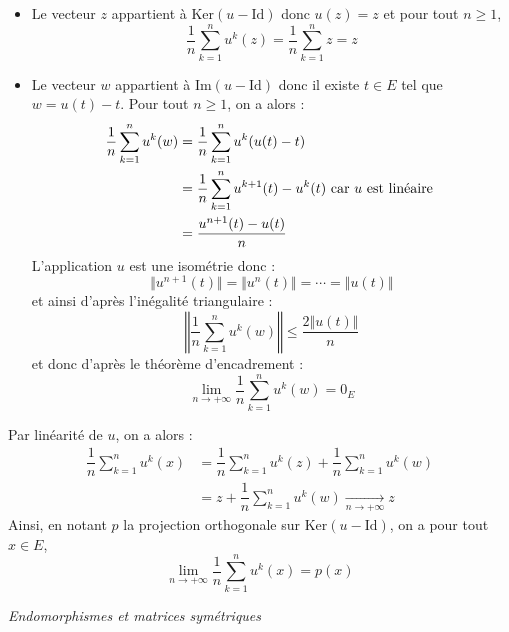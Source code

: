 \documentclass[a4paper,10pt]{report}
\begin{document}
\begin{itemize}
\item Le vecteur $z$ appartient à $\textrm{Ker}(u-\textrm{Id})$ donc $u(z)=z$ et pour tout $n \geq 1$,
$$ \dfrac{1}{n} \sum_{k=1}^n u^k(z) = \dfrac{1}{n} \sum_{k=1}^n z = z$$
\item Le vecteur $w$ appartient à $\textrm{Im}(u-\textrm{Id})$ donc il existe $t \in E$ tel que $w=u(t)-t$. Pour tout $n \geq 1$, on a alors :
\begin{align*}
 \dfrac{1}{n} \sum_{k=1}^n u^k(w) & =  \dfrac{1}{n} \sum_{k=1}^n u^k(u(t)-t) \\
 & = \dfrac{1}{n} \sum_{k=1}^n u^{k+1}(t) - u^k(t) \hbox{ car } u \hbox{ est linéaire } \\
 & = \dfrac{u^{n+1}(t)- u(t)}{n}
\end{align*}
L'application $u$ est une isométrie donc :
$$ \Vert u^{n+1}(t) \Vert = \Vert u^{n}(t) \Vert = \cdots  =\Vert u(t) \Vert $$
et ainsi d'après l'inégalité triangulaire :
$$ \left\Vert  \dfrac{1}{n} \sum_{k=1}^n u^k(w) \right\Vert \leq \dfrac{2\Vert u(t) \Vert}{n}$$
et donc d'après le théorème d'encadrement :
$$ \lim_{n \rightarrow + \infty}  \dfrac{1}{n} \sum_{k=1}^n u^k(w) = 0_E$$
\end{itemize}
Par linéarité de $u$, on a alors :
\begin{align*}
\dfrac{1}{n} \sum_{k=1}^n u^k(x) & =  \dfrac{1}{n} \sum_{k=1}^n u^k(z) +  \dfrac{1}{n} \sum_{k=1}^n u^k(w) \\
& =z + \dfrac{1}{n} \sum_{k=1}^n u^k(w) \underset{ n \rightarrow + \infty}{\longrightarrow} z
\end{align*}
Ainsi, en notant $p$ la projection orthogonale sur $\textrm{Ker}(u- \textrm{Id})$, on a pour tout $x \in E$,
$$ \lim_{n \rightarrow + \infty} \dfrac{1}{n} \sum_{k=1}^n u^k(x) =  p(x)$$


\medskip

\begin{center}
\textit{{ {\large Endomorphismes et matrices symétriques}}}
\end{center}

\medskip
\end{document}
